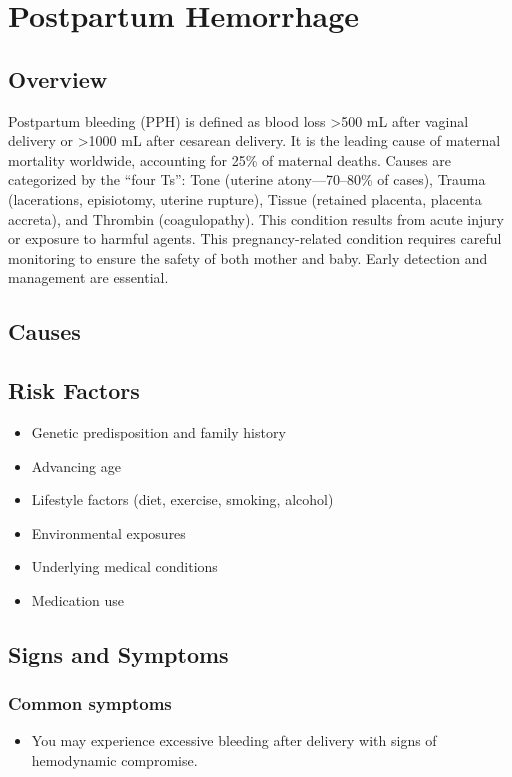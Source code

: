 \chapter{Postpartum Hemorrhage}
\label{sec:Postpartum Hemorrhage}

\section{Overview}
Postpartum bleeding (PPH) is defined as blood loss >500 mL after vaginal delivery or >1000 mL after cesarean delivery. It is the leading cause of maternal mortality worldwide, accounting for 25\% of maternal deaths. Causes are categorized by the ``four Ts'': Tone (uterine atony---70--80\% of cases), Trauma (lacerations, episiotomy, uterine rupture), Tissue (retained placenta, placenta accreta), and Thrombin (coagulopathy). This condition results from acute injury or exposure to harmful agents. This pregnancy-related condition requires careful monitoring to ensure the safety of both mother and baby. Early detection and management are essential.
\section{Causes}
\section{Risk Factors}

\begin{itemize}[noitemsep]
  \item Genetic predisposition and family history
  \item Advancing age
  \item Lifestyle factors (diet, exercise, smoking, alcohol)
  \item Environmental exposures
  \item Underlying medical conditions
  \item Medication use
\end{itemize}
\section{Signs and Symptoms}

\subsection{Common symptoms}
\begin{itemize}[noitemsep]
  \item You may experience excessive bleeding after delivery with signs of hemodynamic compromise. 
  \end{itemize}

